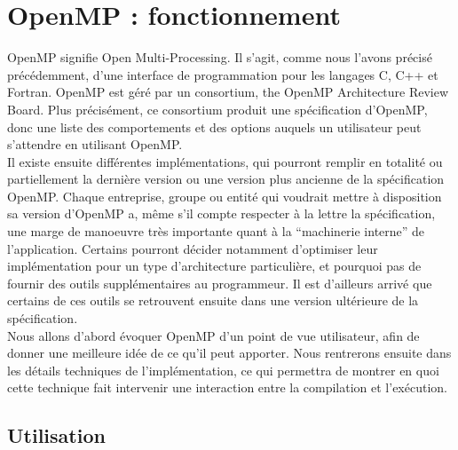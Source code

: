 \documentclass{report}
\begin{document}
  \section{OpenMP : fonctionnement}
OpenMP signifie Open Multi-Processing. Il s'agit, comme nous l'avons précisé précédemment, d'une interface 
de programmation pour les langages C, C++ et Fortran. OpenMP est géré par un consortium, the OpenMP 
Architecture Review Board. Plus précisément, ce consortium produit une spécification d'OpenMP, donc une 
liste des comportements et des options auquels un utilisateur peut s'attendre en utilisant OpenMP.
\\Il existe ensuite différentes implémentations, qui pourront remplir en totalité ou partiellement la 
dernière version ou une version plus ancienne de la spécification OpenMP. Chaque entreprise, groupe 
ou entité qui voudrait mettre à disposition sa version d'OpenMP a, même s'il compte respecter à la lettre
la spécification, une marge de manoeuvre très importante quant à la ``machinerie interne'' de 
l'application. Certains pourront décider notamment d'optimiser leur implémentation pour un type 
d'architecture particulière, et pourquoi pas de fournir des outils supplémentaires au programmeur. Il 
est d'ailleurs arrivé que certains de ces outils se retrouvent ensuite dans une version ultérieure 
de la spécification.
\\Nous allons d'abord évoquer OpenMP d'un point de vue utilisateur, afin de donner une meilleure idée 
de ce qu'il peut apporter. Nous rentrerons ensuite dans les détails techniques de l'implémentation, 
ce qui permettra de montrer en quoi cette technique fait intervenir une interaction entre la compilation
et l'exécution.

\subsection{Utilisation}
\end{document}
